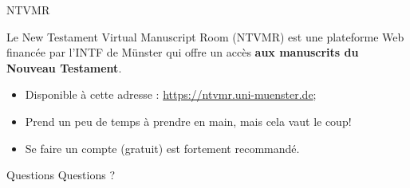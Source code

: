 \documentclass[11pt]{beamer}
\begin{document}
\begin{frame}{NTVMR}
  \begin{alertblock}{}
    Le New Testament Virtual Manuscript Room (NTVMR) est une plateforme Web financée par l'INTF de Münster qui offre un accès \textbf{aux manuscrits du Nouveau Testament}.
  \end{alertblock}
  \begin{itemize}
      \item Disponible à cette adresse : \url{https://ntvmr.uni-muenster.de};
      \item Prend un peu de temps à prendre en main, mais cela vaut le coup!
      \item Se faire un compte (gratuit) est fortement recommandé.
  \end{itemize}
\end{frame}

\begin{frame}{Questions}
    Questions ?
\end{frame}
\end{document}
